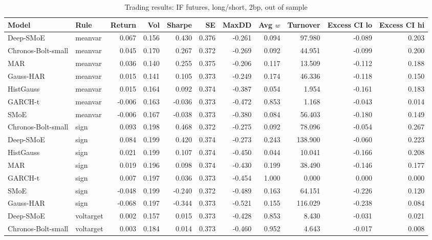 \begin{table}[!htbp]\centering\scriptsize
\caption{Trading results: IF futures, long/short, 2bp, out of sample}\label{tab:econ_if_main}
\begin{adjustbox}{max width=\textwidth}
\begin{tabular}{llrrrrrrrrr}
\toprule
Model & Rule & Return & Vol & Sharpe & SE & MaxDD & Avg $w$ & Turnover & Excess CI lo & Excess CI hi\\
\midrule
Deep-SMoE & meanvar & 0.067 & 0.156 & 0.430 & 0.376 & -0.261 & 0.094 & 97.980 & -0.089 & 0.203\\
Chronos-Bolt-small & meanvar & 0.045 & 0.170 & 0.267 & 0.372 & -0.269 & 0.092 & 44.951 & -0.099 & 0.200\\
MAR & meanvar & 0.036 & 0.140 & 0.255 & 0.375 & -0.206 & 0.117 & 13.509 & -0.112 & 0.188\\
Gauss-HAR & meanvar & 0.015 & 0.141 & 0.105 & 0.373 & -0.249 & 0.174 & 46.336 & -0.118 & 0.150\\
HistGauss & meanvar & 0.015 & 0.164 & 0.092 & 0.374 & -0.387 & 0.054 & 1.954 & -0.161 & 0.183\\
GARCH-t & meanvar & -0.006 & 0.163 & -0.036 & 0.373 & -0.472 & 0.853 & 1.168 & -0.043 & 0.014\\
SMoE & meanvar & -0.006 & 0.167 & -0.038 & 0.373 & -0.380 & 0.084 & 56.403 & -0.180 & 0.149\\
Chronos-Bolt-small & sign & 0.093 & 0.198 & 0.468 & 0.372 & -0.275 & 0.092 & 78.096 & -0.054 & 0.267\\
Deep-SMoE & sign & 0.084 & 0.199 & 0.420 & 0.374 & -0.273 & 0.243 & 138.900 & -0.060 & 0.223\\
HistGauss & sign & 0.021 & 0.199 & 0.107 & 0.374 & -0.450 & 0.044 & 10.041 & -0.166 & 0.208\\
MAR & sign & 0.019 & 0.196 & 0.098 & 0.374 & -0.430 & 0.199 & 38.490 & -0.146 & 0.177\\
GARCH-t & sign & 0.007 & 0.197 & 0.036 & 0.373 & -0.454 & 1.000 & 0.000 & 0.000 & 0.000\\
SMoE & sign & -0.048 & 0.199 & -0.240 & 0.372 & -0.489 & 0.163 & 64.151 & -0.226 & 0.120\\
Gauss-HAR & sign & -0.068 & 0.197 & -0.344 & 0.373 & -0.521 & 0.155 & 116.029 & -0.238 & 0.084\\
Deep-SMoE & voltarget & 0.002 & 0.157 & 0.015 & 0.373 & -0.428 & 0.853 & 8.430 & -0.031 & 0.021\\
Chronos-Bolt-small & voltarget & 0.003 & 0.184 & 0.014 & 0.373 & -0.460 & 0.952 & 4.643 & -0.017 & 0.008\\

\end{tabular}
\end{adjustbox}
\end{table}
